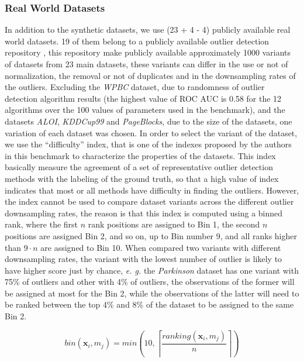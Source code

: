 \subsubsection{Real World Datasets}
\label{sec:datasets:real}
In addition to the synthetic datasets, we use (23 + 4 - 4) publicly available real world datasets. 19 of them belong to a publicly available outlier detection repository \cite{campos2016}, this repository make publicly available approximately 1000 variants of datasets from 23 main datasets, these variants can differ in the use or not of normalization, the removal or not of duplicates and in 	the downsampling rates of the outliers. Excluding the \textit{WPBC} dataset, due to randomness of outlier detection algorithm results (the highest value of ROC AUC is 0.58 for the 12 algorithms over the 100 values of parameters used in the benchmark), and the datasets \textit{ALOI}, \textit{KDDCup99} and \textit{PageBlocks}, due to the size of the datasets, one variation of each dataset was chosen. In order to select the variant of the dataset, we use the ``difficulty'' index, that is one of the indexes proposed by the authors in this benchmark to characterize the properties of the datasets. This index basically measure the agreement of a set of representative outlier detection methods with the labeling of the ground truth, so that a high value of index indicates that most or all methods have difficulty in finding the outliers. %
However, the index cannot be used to compare dataset variants across the different outlier downsampling rates, the reason is that this index is computed using a binned rank, where the first $n$ rank positions are assigned to Bin 1, the second $n$ positions are assigned Bin 2, and so on, up to Bin number 9, and all ranks higher than $9 \cdot n$ are assigned to Bin 10. When compared two variants with different downsampling rates, the variant with the lowest number of outlier is likely to have higher score just by chance, \textit{e. g.} the \textit{Parkinson} dataset has one variant with 75\% of outliers and other with 4\% of outliers, the observations of the former will be assigned at most for the Bin 2, while the observations of the latter will need to be ranked between the top 4\% and 8\% of the dataset to be assigned to the same Bin 2.

\begin{equation}
bin(\mathbf{x}_i, m_j) = min \left( 10, \left\lceil \frac{ranking(\mathbf{x}_i, m_j)}{n} \right\rceil \right)
\end{equation}

